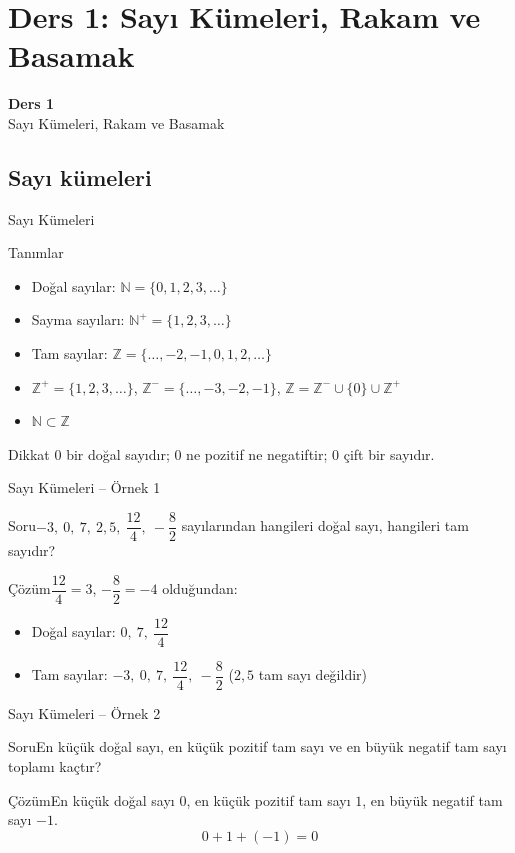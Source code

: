 \documentclass[aspectratio=169,11pt,handout]{beamer}
\newcommand{\soru}[3]{%
\begin{frame}{#1}
  \begin{block}{Soru}\large #2\end{block}
  \pause
  \begin{exampleblock}{Çözüm}\large #3\end{exampleblock}
\end{frame}}
\begin{document}
\section{Ders 1: Sayı Kümeleri, Rakam ve Basamak}
\begin{frame}
\centering\Large\color{anamavi}\textbf{Ders 1}\\[6pt]\normalsize Sayı Kümeleri, Rakam ve Basamak
\end{frame}

\subsection{Sayı kümeleri}
\begin{frame}{Sayı Kümeleri}
\begin{block}{Tanımlar}
\begin{itemize}
\item Doğal sayılar: \(\mathbb{N}=\{0,1,2,3,\dots\}\)
\item Sayma sayıları: \(\mathbb{N}^{+}=\{1,2,3,\dots\}\)
\item Tam sayılar: \(\mathbb{Z}=\{\dots,-2,-1,0,1,2,\dots\}\)
\item \(\mathbb{Z}^{+}=\{1,2,3,\dots\}\), \quad \(\mathbb{Z}^{-}=\{\dots,-3,-2,-1\}\), \quad \(\mathbb{Z}=\mathbb{Z}^{-}\cup\{0\}\cup\mathbb{Z}^{+}\)
\item \(\mathbb{N}\subset\mathbb{Z}\)
\end{itemize}
\end{block}
\begin{alertblock}{Dikkat}
\(0\) bir doğal sayıdır; \(0\) ne pozitif ne negatiftir; \(0\) çift bir sayıdır.
\end{alertblock}
\end{frame}

\soru{Sayı Kümeleri -- Örnek 1}
{\(-3,\ 0,\ 7,\ 2{,}5,\ \dfrac{12}{4},\ -\dfrac{8}{2}\) sayılarından hangileri doğal sayı, hangileri tam sayıdır?}
{\(\dfrac{12}{4}=3\), \(-\dfrac{8}{2}=-4\) olduğundan:
\begin{itemize}
\item Doğal sayılar: \(0,\ 7,\ \dfrac{12}{4}\)
\item Tam sayılar: \(-3,\ 0,\ 7,\ \dfrac{12}{4},\ -\dfrac{8}{2}\) \quad (\(2{,}5\) tam sayı değildir)
\end{itemize}}

\soru{Sayı Kümeleri -- Örnek 2}
{En küçük doğal sayı, en küçük pozitif tam sayı ve en büyük negatif tam sayı toplamı kaçtır?}
{En küçük doğal sayı \(0\), en küçük pozitif tam sayı \(1\), en büyük negatif tam sayı \(-1\).
\[0+1+(-1)=0\]}
\end{document}
